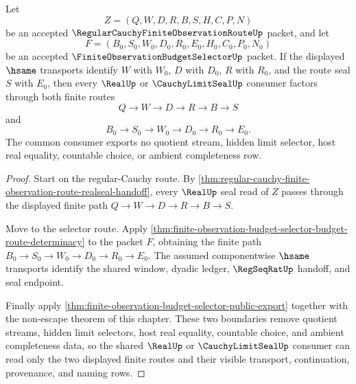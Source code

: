 \begin{theorem}
\label{thm:regular-cauchy-finite-observation-route-budget-selector-pullback}
Let
$$
Z=(Q,W,D,R,B,S,H,C,P,N)
$$
be an accepted $\RegularCauchyFiniteObservationRouteUp$ packet, and let
$$
F=(B_0,S_0,W_0,D_0,R_0,E_0,H_0,C_0,P_0,N_0)
$$
be an accepted $\FiniteObservationBudgetSelectorUp$ packet. If the displayed $\hsame$ transports identify $W$ with $W_0$, $D$ with $D_0$, $R$ with $R_0$, and the route seal $S$ with $E_0$, then every $\RealUp$ or $\CauchyLimitSealUp$ consumer factors through both finite routes
$$
Q \to W \to D \to R \to B \to S
$$
and
$$
B_0 \to S_0 \to W_0 \to D_0 \to R_0 \to E_0 .
$$
The common consumer exports no quotient stream, hidden limit selector, host real equality, countable choice, or ambient completeness row.
\end{theorem}
\begin{proof}
Start on the regular-Cauchy route. By \autoref{thm:regular-cauchy-finite-observation-route-realseal-handoff}, every $\RealUp$ seal read of $Z$ passes through the displayed finite path $Q \to W \to D \to R \to B \to S$.

Move to the selector route. Apply \autoref{thm:finite-observation-budget-selector-budget-route-determinacy} to the packet $F$, obtaining the finite path $B_0 \to S_0 \to W_0 \to D_0 \to R_0 \to E_0$. The assumed componentwise $\hsame$ transports identify the shared window, dyadic ledger, $\RegSeqRatUp$ handoff, and seal endpoint.

Finally apply \autoref{thm:finite-observation-budget-selector-public-export} together with the non-escape theorem of this chapter. These two boundaries remove quotient streams, hidden limit selectors, host real equality, countable choice, and ambient completeness data, so the shared $\RealUp$ or $\CauchyLimitSealUp$ consumer can read only the two displayed finite routes and their visible transport, continuation, provenance, and naming rows.
\end{proof}


